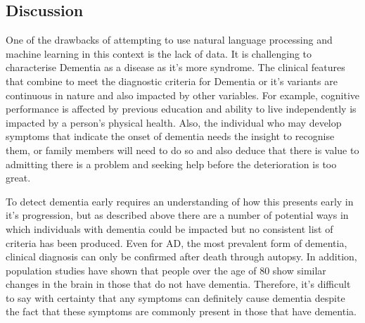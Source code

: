 \documentclass{article}
\begin{document}
\subsection{Discussion}
One of the drawbacks of attempting to use natural language processing and machine learning in this context is the lack of data.
It is challenging to characterise Dementia as a disease as it's more syndrome. The clinical features that combine to meet the diagnostic criteria for Dementia or it's variants are continuous in nature and also impacted by other variables. For example, cognitive performance is affected by previous education and ability to live independently is impacted by a person's physical health. Also, the individual who may develop symptoms that indicate the onset of dementia needs the insight to recognise them, or family members will need to do so and also deduce that there is value to admitting there is a problem and seeking help before the deterioration is too great.
\par
To detect dementia early requires an understanding of how this presents early in it's progression, but as described above there are a number of potential ways in which individuals with dementia could be impacted but no consistent list of criteria has been produced. Even for AD, the most prevalent form of dementia, clinical diagnosis can only be confirmed after death through autopsy. In addition, population studies have shown that people over the age of 80 show similar changes in the brain in those that do not have dementia. Therefore, it's difficult to say with certainty that any symptoms can definitely cause dementia despite the fact that these symptoms are commonly present in those that have dementia.
\par
\end{document}
